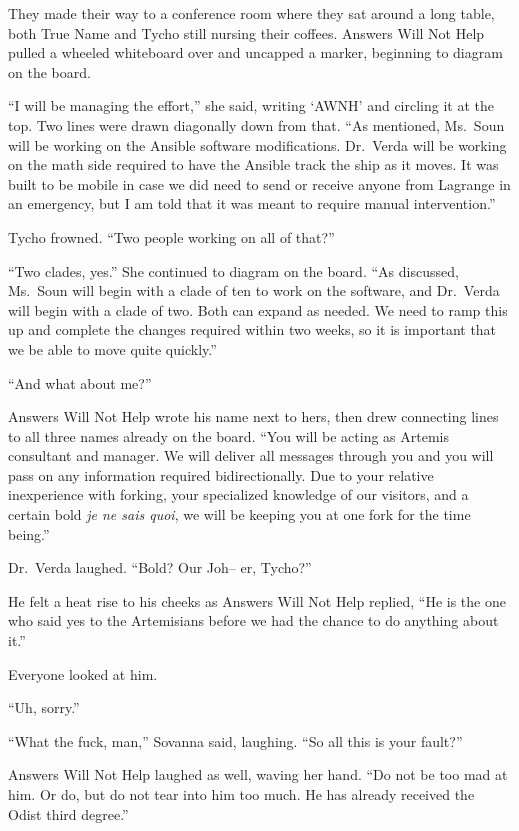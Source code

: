 They made their way to a conference room where they sat around a long table, both True Name and Tycho still nursing their coffees. Answers Will Not Help pulled a wheeled whiteboard over and uncapped a marker, beginning to diagram on the board.

``I will be managing the effort,'' she said, writing `AWNH' and circling it at the top. Two lines were drawn diagonally down from that. ``As mentioned, Ms.~Soun will be working on the Ansible software modifications. Dr.~Verda will be working on the math side required to have the Ansible track the ship as it moves. It was built to be mobile in case we did need to send or receive anyone from Lagrange in an emergency, but I am told that it was meant to require manual intervention.''

Tycho frowned. ``Two people working on all of that?''

``Two clades, yes.'' She continued to diagram on the board. ``As discussed, Ms.~Soun will begin with a clade of ten to work on the software, and Dr.~Verda will begin with a clade of two. Both can expand as needed. We need to ramp this up and complete the changes required within two weeks, so it is important that we be able to move quite quickly.''

``And what about me?''

Answers Will Not Help wrote his name next to hers, then drew connecting lines to all three names already on the board. ``You will be acting as Artemis consultant and manager. We will deliver all messages through you and you will pass on any information required bidirectionally. Due to your relative inexperience with forking, your specialized knowledge of our visitors, and a certain bold \emph{je ne sais quoi}, we will be keeping you at one fork for the time being.''

Dr.~Verda laughed. ``Bold? Our Joh-- er, Tycho?''

He felt a heat rise to his cheeks as Answers Will Not Help replied, ``He is the one who said yes to the Artemisians before we had the chance to do anything about it.''

Everyone looked at him.

``Uh, sorry.''

``What the fuck, man,'' Sovanna said, laughing. ``So all this is your fault?''

Answers Will Not Help laughed as well, waving her hand. ``Do not be too mad at him. Or do, but do not tear into him too much. He has already received the Odist third degree.''

